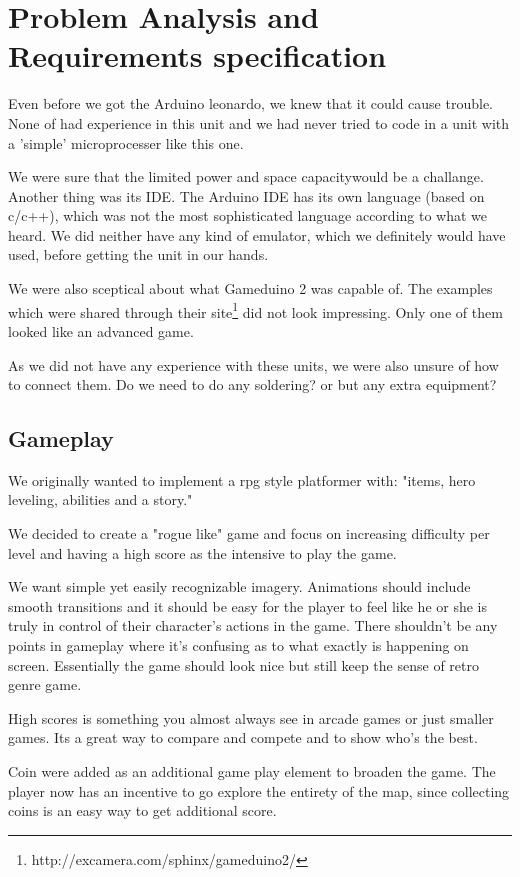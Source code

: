 \chapter{Problem Analysis and Requirements specification}

Even before we got the Arduino leonardo, we knew that it could cause trouble. None of had experience in this unit and
we had never tried to code in a unit with a 'simple'
microprocesser like this one.

We were sure that the limited power and space capacitywould be a challange. Another thing was its IDE. The Arduino IDE has its own language (based on c/c++), which was not the most
sophisticated language according to what we heard. We did neither have any kind of emulator, which we definitely would have used, before getting the unit in our hands.

We were also sceptical about what Gameduino 2 was capable of. The examples
which were shared through their site\footnote{http://excamera.com/sphinx/gameduino2/} did not look impressing. Only one of them
looked like an advanced game.

As we did not have any experience with these units, we were also unsure of how to connect them. Do we need to do any soldering? or but any extra equipment?

\newpage

\section{Gameplay}%
We originally wanted to implement a rpg style platformer with: "items, hero leveling, abilities and a story."

We decided to create a "rogue like" game and focus on increasing difficulty per level and having a high score as the intensive to play the game.

We want simple yet easily recognizable imagery. Animations should include smooth transitions and it should be easy for the player to feel like he or she is truly in control of their character's actions in the game. There shouldn't be any points in gameplay where it's confusing as to what exactly is happening on screen. Essentially the game should look nice but still keep the sense of retro genre game.

High scores is something you almost always see in arcade games or just smaller games. Its a great way to compare and compete and to show who's the best.

Coin were added as an additional game play element to broaden the game. The player now has an incentive to go explore the entirety of the map, since collecting coins is an easy way to get additional score.
